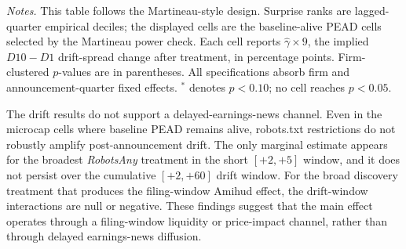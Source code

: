 \documentclass[11pt]{article}
\newcommand{\TableNote}[1]{%
    \par\vspace{0.35em}
    \begin{minipage}{0.96\textwidth}
    \footnotesize\emph{Notes.} #1
    \end{minipage}
}
\begin{document}
\begin{table}[!htbp]
\centering
\caption{Martineau-Style Baseline-Alive PEAD Cells}
\label{tab:robots_pead_martineau}
\begin{threeparttable}
\scriptsize
{}
\TableNote{This table follows the Martineau-style design. Surprise ranks
are lagged-quarter empirical deciles; the displayed cells are the
baseline-alive PEAD cells selected by the Martineau power check. Each cell
reports \(\hat{\gamma}\times 9\), the implied \(D10-D1\) drift-spread change
after treatment, in percentage points. Firm-clustered \(p\)-values are in
parentheses. All specifications absorb firm and announcement-quarter fixed
effects. \(^{*}\) denotes \(p<0.10\); no cell reaches \(p<0.05\).}
\end{threeparttable}
\end{table}

The drift results do not support a delayed-earnings-news channel.  Even in
the microcap cells where baseline PEAD remains alive, robots.txt
restrictions do not robustly amplify post-announcement drift.  The only
marginal estimate appears for the broadest \textit{RobotsAny} treatment in
the short \([+2,+5]\) window, and it does not persist over the cumulative
\([+2,+60]\) drift window.  For the broad discovery treatment that produces
the filing-window Amihud effect, the drift-window interactions are null or
negative.  These findings suggest that the main effect operates through a
filing-window liquidity or price-impact channel, rather than through
delayed earnings-news diffusion.
\end{document}
